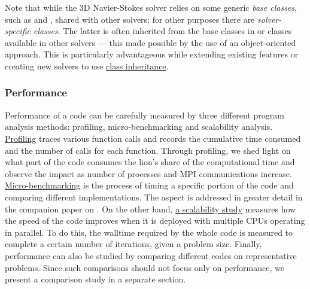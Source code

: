 Note that while the 3D Navier-Stokes solver relies on some generic \emph{base
classes}, such as  and
, shared with other solvers; for other
purposes there are \emph{solver-specific classes}.  The latter is often inherited
from the base classes in  or classes available in other
solvers --- this made possible by the use of an object-oriented approach.  This is
particularly advantageous while extending existing features or creating new
solvers to use
\href{https://docs.python.org/3/tutorial/classes.html#inheritance}{%
class inheritance}.



\subsubsection{Performance}

%
%

Performance of a code can be carefully measured by three different program
analysis methods: profiling, micro-benchmarking and scalability analysis.
%
\href{https://en.wikipedia.org/wiki/Profiling_(computer_programming)}{Profiling}
traces various function calls and records the cumulative time consumed and the
number of calls for each function.  Through profiling, we shed light on what
part of the code consumes the lion's share of the computational time and
observe the impact as number of processes and MPI communications increase.
%
\href{https://en.wiktionary.org/wiki/microbenchmark}{Micro-benchmarking} is the
process of timing a specific portion of the code and comparing different
implementations.  The aspect is addressed in greater detail in the companion
paper on  \citep{fluidfft}.
%
On the other hand,
\href{https://en.wikipedia.org/wiki/Scalability#Performance_tuning_versus_hardware_scalability}{a
scalability study} measures how the speed of the code improves when it is deployed
with multiple CPUs operating in parallel.  To do this, the walltime required by
the whole code is measured to complete a certain number of iterations, given a
problem size.
%
Finally, performance can also be studied by comparing different codes on
representative problems. Since such comparisons should not focus only on
performance, we present a comparison study in a separate section.

